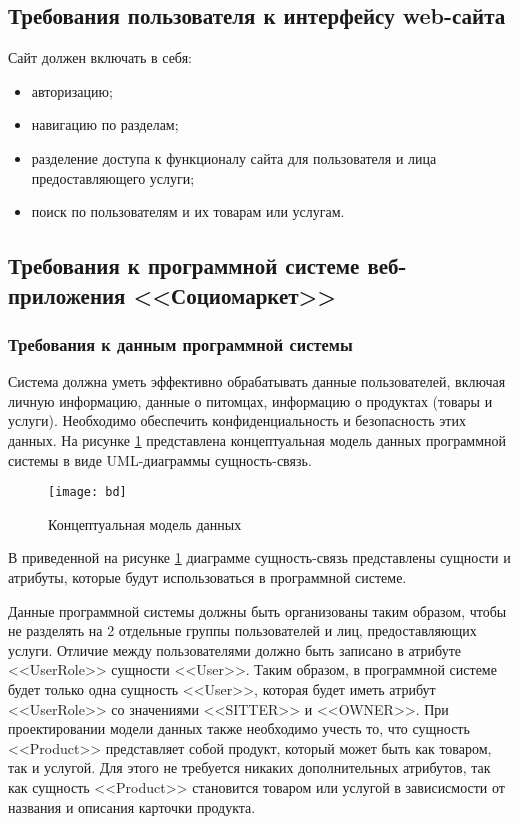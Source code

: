 \subsection{Требования пользователя к интерфейсу web-сайта}

Сайт должен включать в себя:
\begin{itemize}
    \item авторизацию;
    \item навигацию по разделам;
    \item разделение доступа к функционалу сайта для пользователя и лица предоставляющего услуги;
    \item поиск по пользователям и их товарам или услугам.
\end{itemize}


\subsection{Требования к программной системе веб-приложения <<Социомаркет>>}
\subsubsection{Требования к данным программной системы}
Система должна уметь эффективно обрабатывать данные пользователей, включая личную информацию, данные о питомцах, информацию о продуктах (товары и услуги). Необходимо обеспечить конфиденциальность и безопасность этих данных.
На рисунке  \ref{bd:image} представлена концептуальная модель данных программной системы в виде UML-диаграммы сущность-связь.

\begin{figure}[ht]
\centering
\texttt{[image: bd]}
\caption{Концептуальная модель данных}
\label{bd:image}
\end{figure}

В приведенной на рисунке \ref{bd:image} диаграмме сущность-связь представлены сущности и атрибуты, которые будут использоваться в программной системе.

Данные программной системы должны быть организованы таким образом, чтобы не разделять на 2 отдельные группы пользователей и лиц, предоставляющих услуги. Отличие между пользователями должно быть записано в атрибуте <<UserRole>> сущности <<User>>. Таким образом, в программной системе будет только одна сущность <<User>>, которая будет иметь атрибут <<UserRole>> со значениями <<SITTER>> и <<OWNER>>.
При проектировании модели данных также необходимо учесть то, что сущность <<Product>> представляет собой продукт, который может быть как товаром, так и услугой. Для этого не требуется никаких дополнительных атрибутов, так как сущность <<Product>> становится товаром или услугой в зависисмости от названия и описания карточки продукта.

